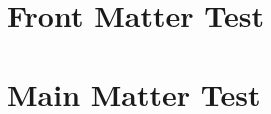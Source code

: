 \documentclass[12pt]{book}
\begin{document}
\frontmatter
\chapter{Front Matter Test}

\mainmatter

\chapter{Main Matter Test}

\printglossaries
\end{document}
